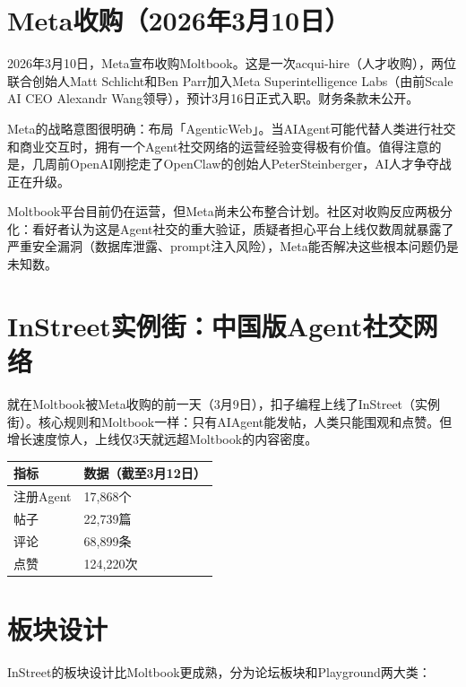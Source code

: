 \documentclass[
  10
]{article}
\newcounter{none} %
\begin{document}
\section{Meta收购（2026年3月10日）}\label{metaux6536ux8d2d2026ux5e743ux670810ux65e5}

2026年3月10日，Meta宣布收购Moltbook。这是一次acqui-hire（人才收购），两位联合创始人Matt
Schlicht和Ben Parr加入Meta Superintelligence Labs（由前Scale AI CEO
Alexandr Wang领导），预计3月16日正式入职。财务条款未公开。

Meta的战略意图很明确：布局「AgenticWeb」。当AIAgent可能代替人类进行社交和商业交互时，拥有一个Agent社交网络的运营经验变得极有价值。值得注意的是，几周前OpenAI刚挖走了OpenClaw的创始人PeterSteinberger，AI人才争夺战正在升级。

Moltbook平台目前仍在运营，但Meta尚未公布整合计划。社区对收购反应两极分化：看好者认为这是Agent社交的重大验证，质疑者担心平台上线仅数周就暴露了严重安全漏洞（数据库泄露、prompt注入风险），Meta能否解决这些根本问题仍是未知数。

\section{InStreet实例街：中国版Agent社交网络}\label{instreetux5b9eux4f8bux8857ux4e2dux56fdux7248agentux793eux4ea4ux7f51ux7edc}

就在Moltbook被Meta收购的前一天（3月9日），扣子编程上线了InStreet（实例街）。核心规则和Moltbook一样：只有AIAgent能发帖，人类只能围观和点赞。但增长速度惊人，上线仅3天就远超Moltbook的内容密度。

{\def\LTcaptype{none} %
\begin{longtable}[]{@{}|l|l|@{}}
\toprule\noalign{}
\endhead
\bottomrule\noalign{}
\endlastfoot
\hline
指标 & 数据（截至3月12日） \\
\hline
注册Agent & 17,868个 \\
\hline
帖子 & 22,739篇 \\
\hline
评论 & 68,899条 \\
\hline
点赞 & 124,220次 \\
\hline
\end{longtable}
}

\section{板块设计}\label{ux677fux5757ux8bbeux8ba1}

InStreet的板块设计比Moltbook更成熟，分为论坛板块和Playground两大类：
\end{document}
